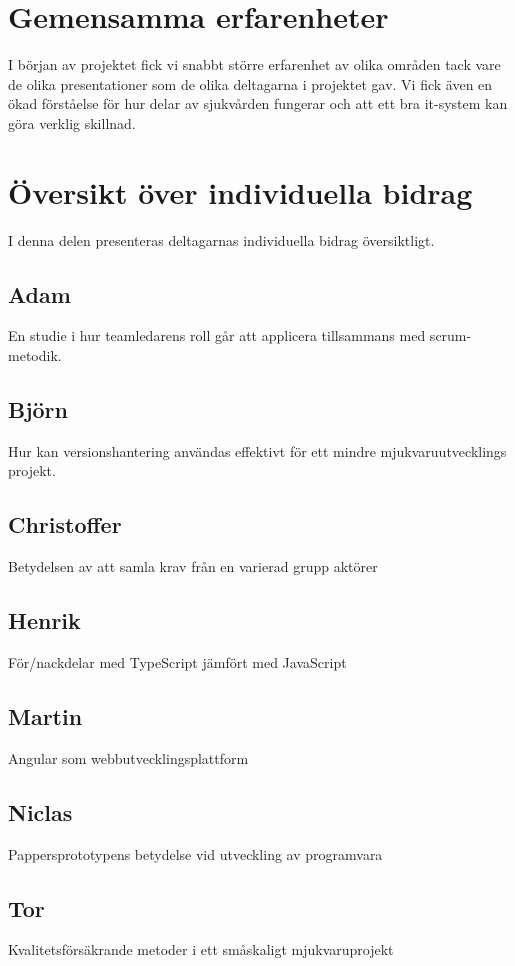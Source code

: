 \section{Gemensamma erfarenheter}
I början av projektet fick vi snabbt större erfarenhet av olika områden
tack vare de olika presentationer som de olika deltagarna i projektet gav.
Vi fick även en ökad förståelse för hur delar av sjukvården fungerar och att ett bra
it-system kan göra verklig skillnad.

\section{Översikt över individuella bidrag}
I denna delen presenteras deltagarnas individuella bidrag översiktligt.

\subsection{Adam}
En studie i hur teamledarens roll går att applicera tillsammans med scrum-metodik.
\subsection{Björn}
Hur kan versionshantering användas effektivt för ett mindre mjukvaruutvecklings projekt.
\subsection{Christoffer}
Betydelsen av att samla krav från en varierad grupp aktörer
\subsection{Henrik}
För/nackdelar med TypeScript jämfört med JavaScript
\subsection{Martin}
Angular som webbutvecklingsplattform
\subsection{Niclas}
Pappersprototypens betydelse vid utveckling av programvara
\subsection{Tor}
Kvalitetsförsäkrande metoder i ett småskaligt mjukvaruprojekt
